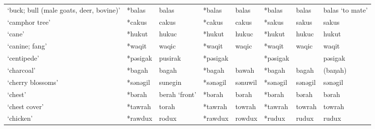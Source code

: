 \begin{landscape}
\begin{longtable}[c]{@{}p{3cm}<{\raggedright}p{2.75cm}<{\raggedright}p{2.75cm}<{\raggedright}p{2.75cm}<{\raggedright}p{2.75cm}<{\raggedright}p{2.75cm}<{\raggedright}p{2.75cm}<{\raggedright}p{2.75cm}<{\raggedright}@{}}
`buck; bull (male goats, deer, bovine)'              & *balas             & balas                          & *balas             & balas                      & *balas           & balas                    & balas `to mate'                   \\
`camphor tree'                                       & *cakus             & cakus                          & *cakus             & cakus                      & *sakus           & sakus                    & sakus                             \\
`cane'                                               & *hukut             & hukuc                          & *hukut             & hukuc                      & *hukut           & hukuc                    & hukut                             \\
`canine; fang'                                       & *waqit             & waqic                          & *waqit             & waqic                      & *waqit           & waqic                    & waqit                             \\
`centipede'                                          & *pəsigak           & pusirak                        & *pəsigak           &                            & *pəsigak         &                          & pəsigak                           \\
`charcoal'                                           & *bagah             & bagah                          & *bagah             & bawah                      & *bagah           & bagah                    & (baŋah)                           \\
`cherry blossoms'                                    & *sənəgil           & sunegin                        & *sənəgil           & sənuwil                    & *sənəgil         & sənəgil                  & sənəgil                           \\
`chest'                                              & *bərah             & berah `front'                  & *bərah             & bərah                      & *bərah           & bərah                    & bərah                             \\
`chest cover'                                        & *tawrah            & torah                          & *tawrah            & towrah                     & *tawrah          & towrah                   & towrah                            \\
`chicken'                                            & *rawdux            & rodux                          & *rawdux            & rowdux                     & *rudux           & rudux                    & rudux                             \\

\end{longtable}
\end{landscape}
